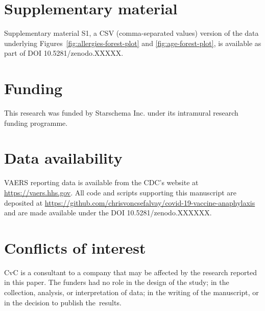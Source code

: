 \documentclass{article}
\begin{document}
\section*{Supplementary material}

Supplementary material S1, a CSV (comma-separated values) version of the data underlying Figures~\ref{fig:allergies-forest-plot} and \ref{fig:age-forest-plot}, is available as part of DOI 10.5281/zenodo.XXXXX.

\section*{Funding}

This research was funded by Starschema Inc. under its intramural research funding programme.

\section*{Data availability}

VAERS reporting data is available from the CDC's website at \url{https://vaers.hhs.gov}.
All code and scripts supporting this manuscript are deposited at
\url{https://github.com/chrisvoncsefalvay/covid-19-vaccine-anaphylaxis} and are made available under the DOI 10.5281/zenodo.XXXXXX.

\section*{Conflicts of interest}

CvC is a consultant to a company that may be affected by the research reported in this paper.
The funders had no role in the design of the study;
in the collection, analysis, or interpretation of data;
in the writing of the manuscript, or in the decision to publish the~results.


\end{document}
